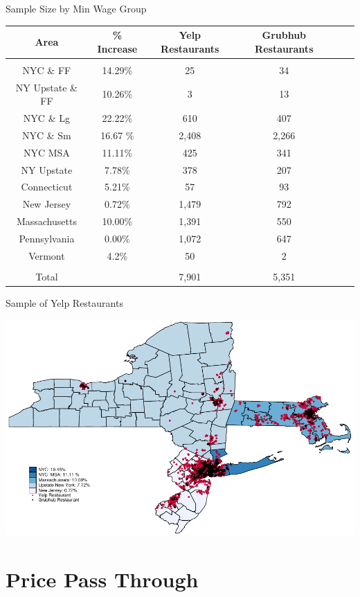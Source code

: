 \documentclass[xcolor=table]{beamer}
\begin{document}
\begin{spacing}{1.2}
\begin{frame}{Sample Size by Min Wage Group}
\scriptsize
\centering
\begin{tabular}{c c c c c c } \\ \hline \hline
Area & \% Increase & Yelp Restaurants   & Grubhub Restaurants\\ \hline \hline
&&& \\
 NYC \& FF  & 14.29\% & 25   & 34 \\
 NY Upstate \& FF  & 10.26\% & 3&13 \\
NYC \& Lg & 22.22\% & 610 &  407\\
NYC \& Sm & 16.67 \% & 2,408 &  2,266\\
NYC MSA & 11.11\% & 425 &341\\
NY Upstate & 7.78\% & 378 &  207 \\
Connecticut & 5.21\% & 57  &  93 \\
New Jersey & 0.72\% & 1,479 & 792\\
Massachusetts & 10.00\% & 1,391 &  550\\
Pennsylvania & 0.00\% &  1,072 &  647\\
Vermont & 4.2\% & 50 & 2\\
\\ \hline
Total & & 7,901 &  5,351 \\
\end{tabular}
\end{frame}


\begin{frame}{Sample of Yelp Restaurants}

\centering
\includegraphics[scale=.65]{map_yelp.pdf}

\end{frame}

\section{Price Pass Through}


\end{spacing}
\end{document}
